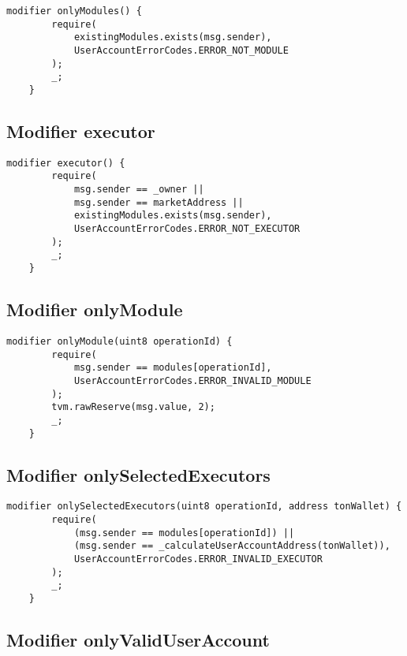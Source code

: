 \begin{lstlisting}[firstnumber=576]
    modifier onlyModules() {
        require(
            existingModules.exists(msg.sender),
            UserAccountErrorCodes.ERROR_NOT_MODULE
        );
        _;
    }
\end{lstlisting}

\subsection{Modifier executor}


\begin{lstlisting}[firstnumber=584]
    modifier executor() {
        require(
            msg.sender == _owner ||
            msg.sender == marketAddress ||
            existingModules.exists(msg.sender),
            UserAccountErrorCodes.ERROR_NOT_EXECUTOR
        );
        _;
    }
\end{lstlisting}

\subsection{Modifier onlyModule}


\begin{lstlisting}[firstnumber=594]
    modifier onlyModule(uint8 operationId) {
        require(
            msg.sender == modules[operationId],
            UserAccountErrorCodes.ERROR_INVALID_MODULE
        );
        tvm.rawReserve(msg.value, 2);
        _;
    }
\end{lstlisting}

\subsection{Modifier onlySelectedExecutors}


\begin{lstlisting}[firstnumber=603]
    modifier onlySelectedExecutors(uint8 operationId, address tonWallet) {
        require(
            (msg.sender == modules[operationId]) ||
            (msg.sender == _calculateUserAccountAddress(tonWallet)),
            UserAccountErrorCodes.ERROR_INVALID_EXECUTOR
        );
        _;
    }
\end{lstlisting}

\subsection{Modifier onlyValidUserAccount}


